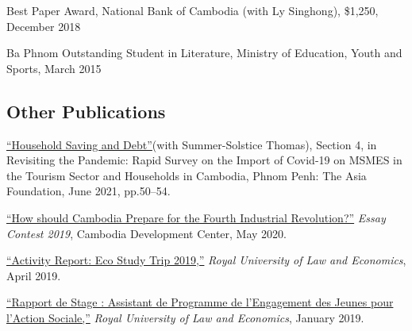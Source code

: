 \documentclass[10pt,a4paper]{article}
\begin{document}
	Best Paper Award, National Bank of Cambodia (with Ly Singhong), \$1,250, December 2018 
	
	Ba Phnom Outstanding Student in Literature, Ministry of Education, Youth and Sports, March 2015




\subsection*{Other Publications}

	\href{https://kosalnith.github.io/research/policies/COVID-19-HHSavingsDebt.pdf}{``Household Saving and Debt”}(with Summer-Solstice Thomas), Section 4, in Revisiting the Pandemic: Rapid Survey on the Import of Covid-19 on MSMES in the Tourism Sector and Households in Cambodia, Phnom Penh: The Asia Foundation, June 2021, pp.50--54.\\ \vspace{-.5em} 
			
	\href{https://cd-center.org/en/essay-contest-2019-first-place-winner/}{``How should Cambodia Prepare for the Fourth Industrial Revolution?''} \textit{Essay Contest 2019}, Cambodia Development Center, May 2020.\\ \vspace{-.5em}
			
	\href{https://kosalnith.github.io/research/reports/EcoStudy_2019.pdf}{``Activity Report: Eco Study Trip 2019,”} \textit{Royal University of Law and Economics}, April 2019. \\ \vspace{-.5em}
			
	\href{https://www.researchgate.net/publication/330936932_Rapport_du_Stage_Assistant_de_Programme_a_l%27YRDP}{``Rapport de Stage : Assistant de Programme de l'Engagement des Jeunes pour l'Action Sociale,”} \textit{Royal University of Law and Economics}, January 2019. \\ \vspace{-.5em}
			
\end{document}
